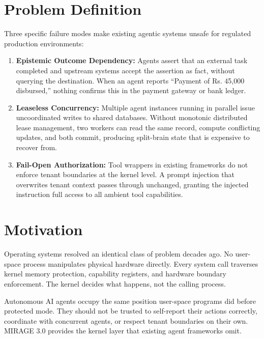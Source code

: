 \documentclass[12pt,a4paper]{report}
\numberwithin{equation}{section}
\begin{document}
\section{Problem Definition}
Three specific failure modes make existing agentic systems unsafe for regulated production environments:
\begin{enumerate}
    \item \textbf{Epistemic Outcome Dependency:} Agents assert that an external task completed and upstream systems accept the assertion as fact, without querying the destination. When an agent reports ``Payment of Rs. 45,000 disbursed,'' nothing confirms this in the payment gateway or bank ledger.
    \item \textbf{Leaseless Concurrency:} Multiple agent instances running in parallel issue uncoordinated writes to shared databases. Without monotonic distributed lease management, two workers can read the same record, compute conflicting updates, and both commit, producing split-brain state that is expensive to recover from.
    \item \textbf{Fail-Open Authorization:} Tool wrappers in existing frameworks do not enforce tenant boundaries at the kernel level. A prompt injection that overwrites tenant context passes through unchanged, granting the injected instruction full access to all ambient tool capabilities.
\end{enumerate}

\section{Motivation}
Operating systems resolved an identical class of problem decades ago. No user-space process manipulates physical hardware directly. Every system call traverses kernel memory protection, capability registers, and hardware boundary enforcement. The kernel decides what happens, not the calling process.

Autonomous AI agents occupy the same position user-space programs did before protected mode. They should not be trusted to self-report their actions correctly, coordinate with concurrent agents, or respect tenant boundaries on their own. MIRAGE 3.0 provides the kernel layer that existing agent frameworks omit.
\end{document}
